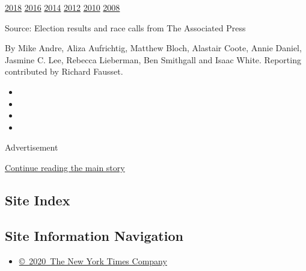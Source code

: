 \href{https://www.nytimes3xbfgragh.onion/interactive/2018/11/06/us/elections/results-mississippi-elections.html}{2018}
\href{https://www.nytimes3xbfgragh.onion/elections/2016/results/mississippi}{2016}
\href{https://www.nytimes3xbfgragh.onion/elections/2014/mississippi-elections}{2014}
\href{https://www.nytimes3xbfgragh.onion/elections/2012/results/states/mississippi.html}{2012}
\href{https://www.nytimes3xbfgragh.onion/elections/2010/results/mississippi.html}{2010}
\href{https://www.nytimes3xbfgragh.onion/elections/2008/results/states/mississippi.html}{2008}

Source: Election results and race calls from The Associated Press

By Mike Andre, Aliza Aufrichtig, Matthew Bloch, Alastair Coote, Annie
Daniel, Jasmine C. Lee, Rebecca Lieberman, Ben Smithgall and Isaac
White. Reporting contributed by Richard Fausset.

\begin{itemize}
\item
\item
\item
\item
\end{itemize}

Advertisement

\protect\hyperlink{after-bottom}{Continue reading the main story}

\hypertarget{site-index}{%
\subsection{Site Index}\label{site-index}}

\hypertarget{site-information-navigation}{%
\subsection{Site Information
Navigation}\label{site-information-navigation}}

\begin{itemize}
\tightlist
\item
  \href{https://help.nytimes3xbfgragh.onion/hc/en-us/articles/115014792127-Copyright-notice}{©~2020~The
  New York Times Company}
\end{itemize}

